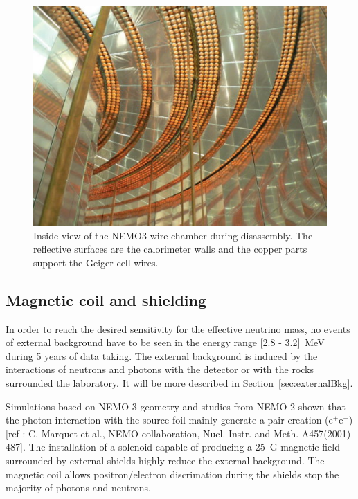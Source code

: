 \documentclass[main.tex]{subfiles}
\begin{document}
\begin{figure}[h!]
\begin{center}
\includegraphics[scale=0.80]{pictures/Chap3/NEMO3Inside.jpg}
\caption{Inside view of the NEMO3 wire chamber during disassembly. The reflective surfaces are the calorimeter walls and the copper parts support the Geiger cell wires.}
\label{NEMO3Inside}
\end{center}
\end{figure}


\FloatBarrier


\subsection{Magnetic coil and shielding}


\NI In order to reach the desired sensitivity for the effective neutrino mass, no events of external background have to be seen in the energy range [2.8 - 3.2]~MeV during 5 years of data taking. The external background is induced by the interactions of neutrons and photons with the detector or with the rocks surrounded the laboratory. It will be more described in Section~\ref{sec:externalBkg}. 


\bigskip


\NI Simulations based on NEMO-3 geometry and studies from NEMO-2 shown that the photon interaction with the source foil mainly generate a pair creation (e$^+$e$^-$) [ref : C. Marquet et al., NEMO collaboration, Nucl. Instr. and Meth. A457(2001) 487]. The installation of a solenoid capable of producing a 25~G magnetic field surrounded by external shields highly reduce the external background. The magnetic coil allows positron/electron discrimation during the shields stop the majority of photons and neutrons.  
\end{document}
